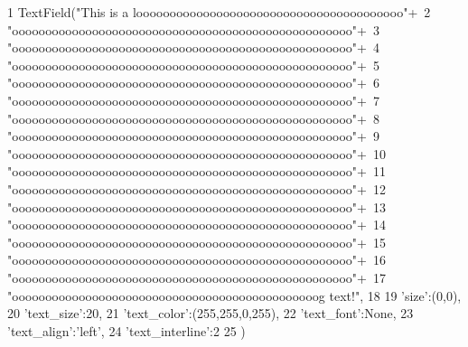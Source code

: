 \begin{DoxyCode}
1 TextField("This is a loooooooooooooooooooooooooooooooooooooooo\n"+\
2                       "ooooooooooooooooooooooooooooooooooooooooooooooooooo\n"+\
3                       "ooooooooooooooooooooooooooooooooooooooooooooooooooo\n"+\
4                       "ooooooooooooooooooooooooooooooooooooooooooooooooooo\n"+\
5                       "ooooooooooooooooooooooooooooooooooooooooooooooooooo\n"+\
6                       "ooooooooooooooooooooooooooooooooooooooooooooooooooo\n"+\
7                       "ooooooooooooooooooooooooooooooooooooooooooooooooooo\n"+\
8                       "ooooooooooooooooooooooooooooooooooooooooooooooooooo\n"+\
9                       "ooooooooooooooooooooooooooooooooooooooooooooooooooo\n"+\
10                       "ooooooooooooooooooooooooooooooooooooooooooooooooooo\n"+\
11                       "ooooooooooooooooooooooooooooooooooooooooooooooooooo\n"+\
12                       "ooooooooooooooooooooooooooooooooooooooooooooooooooo\n"+\
13                       "ooooooooooooooooooooooooooooooooooooooooooooooooooo\n"+\
14                       "ooooooooooooooooooooooooooooooooooooooooooooooooooo\n"+\
15                       "ooooooooooooooooooooooooooooooooooooooooooooooooooo\n"+\
16                       "ooooooooooooooooooooooooooooooooooooooooooooooooooo\n"+\
17                       "oooooooooooooooooooooooooooooooooooooooooooooog text!",
18                       {
19                         'size':(0,0),
20                         'text_size':20,
21                         'text_color':(255,255,0,255),
22                         'text_font':None,
23                         'text_align':'left',
24                         'text_interline':2
25                       })
\end{DoxyCode}
